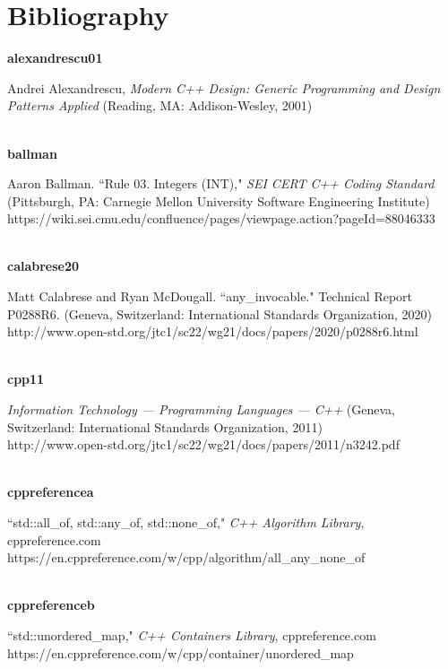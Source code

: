 
\chapter*{Bibliography}

\noindent\textbf{alexandrescu01}\\
\hspace*{2em}\parbox[t]{\textwidth}{Andrei Alexandrescu, \textit{Modern C++ Design: Generic Programming and Design Patterns Applied} (Reading, MA: Addison-Wesley, 2001)}\\

\noindent\textbf{ballman}\\
\hspace*{2em}\parbox[t]{\textwidth}{Aaron Ballman. ``Rule 03. Integers (INT)," \textit{ SEI CERT C++ Coding Standard} (Pittsburgh, PA: Carnegie Mellon University Software Engineering Institute)\\
https://wiki.sei.cmu.edu/confluence/pages/viewpage.action?pageId=88046333}\\

\noindent\textbf{calabrese20}\\
\hspace*{2em}\parbox[t]{\textwidth}{Matt Calabrese and Ryan McDougall. ``{\ttfamily any\_invocable}."  Technical Report P0288R6. (Geneva, Switzerland: International Standards Organization, 2020)\\
http://www.open-std.org/jtc1/sc22/wg21/docs/papers/2020/p0288r6.html}\\

\noindent\textbf{cpp11}\\
\hspace*{2em}\parbox[t]{\textwidth}{\textit{Information Technology — Programming
Languages — C++} (Geneva, Switzerland: International Standards Organization, 2011)\\
http://www.open-std.org/jtc1/sc22/wg21/docs/papers/2011/n3242.pdf}\\

\noindent\textbf{cppreferencea}\\
\hspace*{2em}\parbox[t]{\textwidth}{``std::all\_of, std::any\_of, std::none\_of," \textit{C++ Algorithm Library}, cppreference.com\\
https://en.cppreference.com/w/cpp/algorithm/all\_any\_none\_of}\\

\noindent\textbf{cppreferenceb}\\
\hspace*{2em}\parbox[t]{\textwidth}{``std::unordered\_map," \textit{C++ Containers Library}, cppreference.com\\
https://en.cppreference.com/w/cpp/container/unordered\_map}\\

